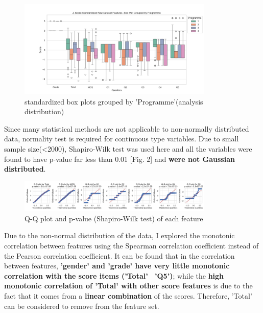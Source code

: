 \documentclass[journal]{IEEEtai}
\begin{document}
\begin{figure}[htbp]
\centerline{\includegraphics[width=22pc]{Z-Score_raw_dataset_box_plot_by_programme.png}}
\caption{standardized box plots grouped by 'Programme'(analysis distribution)}
\end{figure}

Since many statistical methods are not applicable to non-normally distributed data, normality test is required for continuous type variables. Due to small sample size(\textless 2000), Shapiro-Wilk test was used here and all the variables were found to have p-value far less than 0.01 [Fig. 2] and \textbf{were not Gaussian distributed}.

\begin{figure}[htbp]
	\centerline{\includegraphics[width=22pc]{Shapiro-Wilk test.png}}
	\caption{Q-Q plot and p-value (Shapiro-Wilk test) of each feature}
\end{figure}

Due to the non-normal distribution of the data, I explored the monotonic correlation between features using the Spearman correlation coefficient instead of the Pearson correlation coefficient. It can be found that in the correlation between features, \textbf{'gender' and 'grade' have very little monotonic correlation with the score items ('Total'~ 'Q5')}; while the \textbf{high monotonic correlation of 'Total' with other score features} is due to the fact that it comes from a \textbf{linear combination} of the scores. Therefore, 'Total' can be considered to remove from the feature set.
\end{document}
